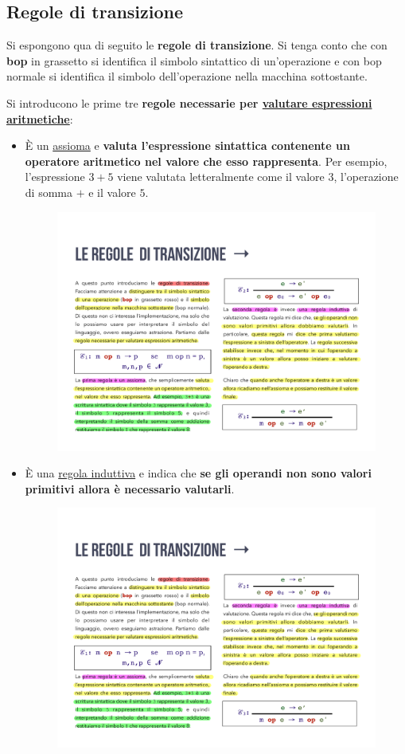 \documentclass[a4paper]{article}
\begin{document}
	\subsection{Regole di transizione}
	
	Si espongono qua di seguito le \textcolor{Red3}{\textbf{regole di transizione}}. Si tenga conto che con \textbf{bop} in grassetto si identifica il simbolo sintattico di un'operazione e con bop normale si identifica il simbolo dell'operazione nella macchina sottostante.\newline
	
	\noindent
	Si introducono le prime tre \textbf{regole necessarie per \underline{valutare espressioni aritmetiche}}:
	\begin{itemize}
		\item È un \underline{assioma} e \textbf{valuta l'espressione sintattica contenente un operatore aritmetico nel valore che esso rappresenta}. Per esempio, l'espressione $3+5$ viene valutata letteralmente come il valore $3$, l'operazione di somma $+$ e il valore $5$.
		\begin{figure}[!htp]
			\centering
			\includegraphics[width=.65\textwidth]{img/regola_transizione-1.pdf}
		\end{figure}
		
		\item È una \underline{regola induttiva} e indica che \textbf{se gli operandi non sono valori primitivi allora è necessario valutarli}.
		\begin{figure}[!htp]
			\centering
			\includegraphics[width=.65\textwidth]{img/regola_transizione-2.pdf}
		\end{figure}
		

\end{itemize}
\end{document}
